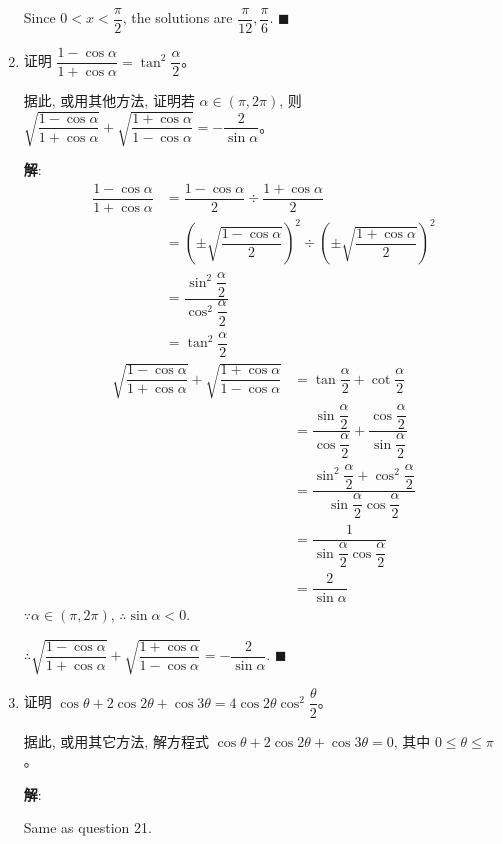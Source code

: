 \documentclass{report}
\newcommand{\sol}{\vspace{0.2cm}\textbf{解}:}
\begin{document}
\begin{enumerate}[leftmargin=*]
    Since $0 < x < \dfrac{\pi}{2}$, the solutions are $\dfrac{\pi}{12}, \dfrac{\pi}{6}$. \hfill $\blacksquare$

    \item 证明 $\dfrac{1-\cos \alpha}{1+\cos \alpha}=\tan ^2 \dfrac{\alpha}{2}$。

    据此, 或用其他方法, 证明若 $\alpha \in(\pi, 2 \pi)$, 则 $\sqrt{\dfrac{1-\cos \alpha}{1+\cos \alpha}}+\sqrt{\dfrac{1+\cos \alpha}{1-\cos \alpha}}=-\dfrac{2}{\sin \alpha}$。

    \sol{}
    \begin{align*}
        \dfrac{1-\cos \alpha}{1+\cos \alpha} &= \dfrac{1-\cos\alpha}{2} \div \dfrac{1+\cos\alpha}{2}\\
        & = \left(\pm\sqrt{\dfrac{1-\cos\alpha}{2}}\right)^2 \div \left(\pm\sqrt{\dfrac{1+\cos\alpha}{2}}\right)^2\\
        & = \dfrac{\sin^2\dfrac{\alpha}{2}}{\cos^2\dfrac{\alpha}{2}}\\
        & = \tan^2\dfrac{\alpha}{2}
    \end{align*}
    \begin{align*}
        \sqrt{\dfrac{1-\cos \alpha}{1+\cos \alpha}}+\sqrt{\dfrac{1+\cos \alpha}{1-\cos \alpha}} &= \tan\dfrac{\alpha}{2} + \cot\dfrac{\alpha}{2}\\
        &= \dfrac{\sin\dfrac{\alpha}{2}}{\cos\dfrac{\alpha}{2}} + \dfrac{\cos\dfrac{\alpha}{2}}{\sin\dfrac{\alpha}{2}}\\
        &= \dfrac{\sin^2\dfrac{\alpha}{2} + \cos^2\dfrac{\alpha}{2}}{\sin\dfrac{\alpha}{2}\cos\dfrac{\alpha}{2}}\\
        &= \dfrac{1}{\sin\dfrac{\alpha}{2}\cos\dfrac{\alpha}{2}}\\
        &= \dfrac{2}{\sin\alpha}
    \end{align*}
    $\because \alpha \in(\pi, 2\pi)$, $\therefore \sin\alpha < 0$.
    
    $\therefore \sqrt{\dfrac{1-\cos \alpha}{1+\cos \alpha}}+\sqrt{\dfrac{1+\cos \alpha}{1-\cos \alpha}}=-\dfrac{2}{\sin \alpha}$. \hfill $\blacksquare$

    \item 证明 $\cos \theta+2 \cos 2 \theta+\cos 3 \theta=4 \cos 2 \theta \cos ^2 \dfrac{\theta}{2}$。

    据此, 或用其它方法, 解方程式 $\cos \theta+2 \cos 2 \theta+\cos 3 \theta=0$, 其中 $0 \leq \theta \leq \pi$。
    
    \sol{}

    Same as question 21.


\end{enumerate}
\end{document}
